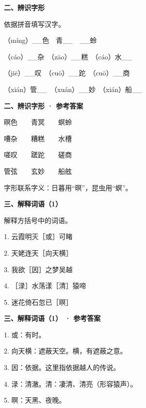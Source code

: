 \documentclass[UTF8,10pt,aspectratio=169]{ctexbeamer}
\newcommand{\PageHeading}[1]{\begin{center}{\Large\bfseries #1}\end{center}\vspace{0.2cm}}
\begin{document}
\begin{frame}
\PageHeading{二、辨识字形}
依据拼音填写汉字。\par\vspace{0.23cm}
（míng）\_\_色　青\_\_　\_\_蛉\par\vspace{0.23cm}
（cáo）\_\_杂　（zāo）\_\_糕　（cáo）水\_\_\par\vspace{0.23cm}
（jiē）\_\_叹　（cuō）\_\_跎　（cuō）\_\_商\par\vspace{0.23cm}
（xián）管\_\_　（xuán）\_\_妙　（xián）船\_\_\par\vspace{0.23cm}
\end{frame}
\begin{frame}
\PageHeading{二、辨识字形 · 参考答案}
暝色　　青冥　　螟蛉\par\vspace{0.23cm}
嘈杂　　糟糕　　水槽\par\vspace{0.23cm}
嗟叹　　蹉跎　　磋商\par\vspace{0.23cm}
管弦　　玄妙　　船舷\par\vspace{0.23cm}
字形联系字义：日暮用“暝”，昆虫用“螟”。\par\vspace{0.23cm}
\end{frame}
\begin{frame}
\PageHeading{三、解释词语（1）}
解释方括号中的词语。\par\vspace{0.23cm}
1. 云霞明灭［或］可睹\par\vspace{0.23cm}
2. 天姥连天［向天横］\par\vspace{0.23cm}
3. 我欲［因］之梦吴越\par\vspace{0.23cm}
4. ［渌］水荡漾［清］猿啼\par\vspace{0.23cm}
5. 迷花倚石忽已［暝］\par\vspace{0.23cm}
\end{frame}
\begin{frame}
\PageHeading{三、解释词语（1） · 参考答案}
1. 或：有时。\par\vspace{0.23cm}
2. 向天横：遮蔽天空。横，有遮蔽之意。\par\vspace{0.23cm}
3. 因：依据。这里指依据越人的传说。\par\vspace{0.23cm}
4. 渌：清澈。清：凄清、清亮（形容猿声）。\par\vspace{0.23cm}
5. 暝：天黑、夜晚。\par\vspace{0.23cm}
\end{frame}
\end{document}
